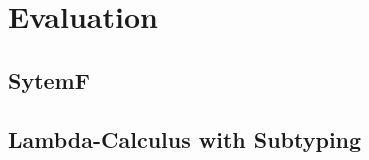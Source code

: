 \chapter{Evaluation}
\label{cha:evaluation}

\section{SytemF}
\section{Lambda-Calculus with Subtyping}


